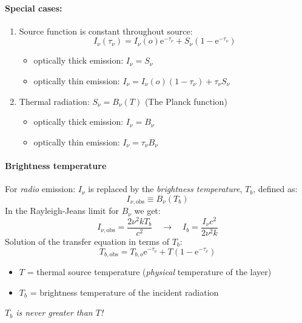 \documentclass[11pt]{article}
\newcommand{\mar}[1]{\hspace{0pt}\marginpar{-\textcolor{black}{#1}-}}
\newcommand{\mynotes}[1]{{\fontfamily{cmss}\selectfont \textit{#1}}}
\begin{document}
\paragraph{Special cases:}
\begin{enumerate}
    \item Source function is constant throughout source:
        \[
            I_{\nu}(\tau_{\nu}) =
            I_{\nu}(o)\mathrm{e}^{-\tau_{\nu}}
            + S_{\nu}(1-\mathrm{e}^{-\tau_{\nu}})
            \]
        \begin{itemize}[itemsep=1ex]
            \item optically thick emission:
                $I_{\nu}=S_{\nu}$
            \item optically thin emission:
                $I_{\nu}=I_{\nu}(o)(1-\tau_{\nu}) + \tau_{\nu}S_{\nu}$
        \end{itemize}
    \item Thermal radiation: $S_{\nu} = B_{\nu}(T) $ (The Planck function)
        \begin{itemize}[itemsep=1ex]
            \item optically thick emission:
                $I_{\nu}=B_{\nu}$
            \item optically thin emission:
                $I_{\nu}=\tau_{\nu}B_{\nu}$
        \end{itemize}
\end{enumerate}

\paragraph{Brightness temperature}
For \emph{radio} emission:
$I_{\nu}$ is replaced by the \textit{brightness temperature},
$T_{b}$, defined as:
\[
    I_{\nu,\mathrm{obs}} \equiv B_{\nu}(T_b)
    \]
In the Rayleigh-Jeans limit for $B_{\nu}$ we get:
\[
    I_{\nu,\mathrm{obs}} = \frac{2\nu^{2}kT_{b}}{c^{2}}
    \quad\longrightarrow\quad
    I_{b} = \frac{I_{\nu}c^{2}}{2\nu^{2}k}
    \]
Solution of the transfer equation in terms of $T_{b}$:
\[
    T_{b,\mathrm{obs}} =
    T_{b,o}\mathrm{e}^{-\tau_{\nu}}
    + T(1-\mathrm{e}^{-\tau_{\nu}})
    \]
\begin{itemize}[label={}, noitemsep]
    \item \mar{28}$T$ = thermal source temperature (\emph{physical}
        temperature of the layer)
    \item $T_{b}$ = brightness temperature of the incident radiation
\end{itemize}
\mynotes{$T_{b}$ is never greater than $T$!}
\end{document}
